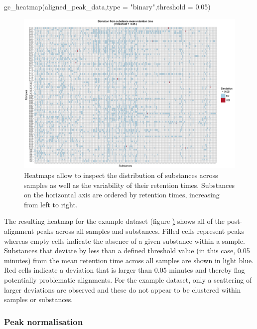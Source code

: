 \begin{Schunk}
\begin{Sinput}
gc_heatmap(aligned_peak_data,type = "binary",threshold = 0.05)
\end{Sinput}
\end{Schunk}

\begin{figure}[htbp]
\centering
\includegraphics[width=13cm]{figures/heatmap}
\caption{Heatmaps allow to inspect the distribution of substances across samples as well as the variability of their retention times. Substances on the horizontal axis are ordered by retention times, increasing from left to right.}
\label{figure:heatmap}
\end{figure}

The resulting heatmap for the example dataset (figure
\href{figure:heatmap}) shows all of the post-alignment peaks across all
samples and substances. Filled cells represent peaks whereas empty cells
indicate the absence of a given substance within a sample. Substances
that deviate by less than a defined threshold value (in this case, 0.05
minutes) from the mean retention time across all samples are shown in
light blue. Red cells indicate a deviation that is larger than 0.05
minutes and thereby flag potentially problematic alignments. For the
example dataset, only a scattering of larger deviations are observed and
these do not appear to be clustered within samples or substances.

\subsubsection{Peak normalisation}\label{peak-normalisation}

